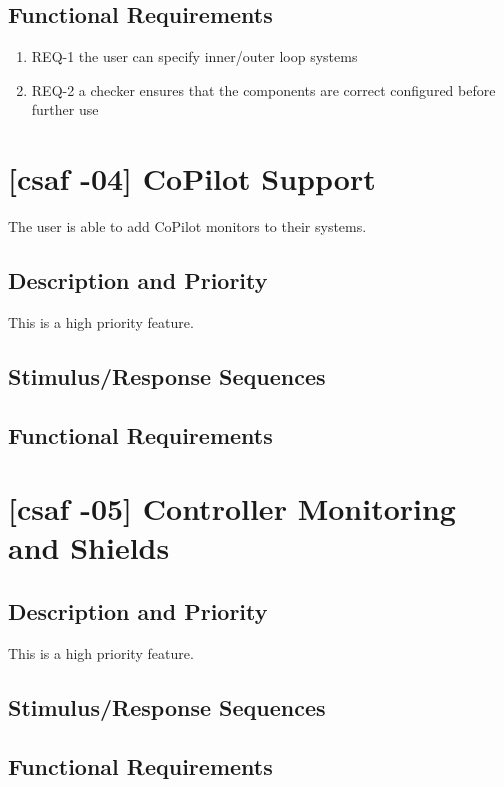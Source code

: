 \subsection{Functional Requirements}
\begin{enumerate}
\item REQ-1 \quad the user can specify inner/outer loop systems
\item REQ-2 \quad a checker ensures that the components are correct configured before further use
\end{enumerate}

\section{[\acrshort{csaf} -04] CoPilot Support}
The user is able to add CoPilot monitors to their systems.

\subsection{Description and Priority}
This is a high priority feature.

\subsection{Stimulus/Response Sequences}


\subsection{Functional Requirements}

\section{[\acrshort{csaf} -05] Controller Monitoring and Shields}

\subsection{Description and Priority}
This is a high priority feature.

\subsection{Stimulus/Response Sequences}


\subsection{Functional Requirements}

